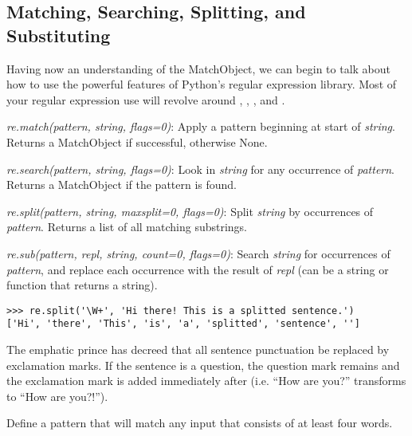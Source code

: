 \subsection*{Matching, Searching, Splitting, and Substituting}
Having now an understanding of the MatchObject, we can begin to talk about how to use the powerful features of Python's
regular expression library.
Most of your regular expression use will revolve around , , , and .
\begin{description}
\item \emph{re.match(pattern, string, flags=0)}:  Apply a pattern beginning at start of \emph{string}.  Returns a MatchObject if successful, otherwise None.
\item \emph{re.search(pattern, string, flags=0)}:  Look in \emph{string} for any occurrence of \emph{pattern}.  Returns a MatchObject if the pattern is found.
\item \emph{re.split(pattern, string, maxsplit=0, flags=0)}: Split \emph{string} by occurrences of \emph{pattern}.  Returns a list of all matching substrings.
\item \emph{re.sub(pattern, repl, string, count=0, flags=0)}: Search \emph{string} for occurrences of \emph{pattern}, and replace each occurrence with the result of \emph{repl} (can be a string or function that returns a string).
\end{description}

\begin{lstlisting}
>>> re.split('\W+', 'Hi there! This is a splitted sentence.')
['Hi', 'there', 'This', 'is', 'a', 'splitted', 'sentence', '']
\end{lstlisting}

\begin{problem}
The emphatic prince has decreed that all sentence punctuation be replaced by exclamation marks.  If the sentence is a question, the question mark remains and the exclamation mark is added immediately after (i.e. ``How are you?'' transforms to ``How are you?!'').  
\end{problem}

\begin{problem}
Define a pattern that will match any input that consists of at least four words.
\end{problem}

